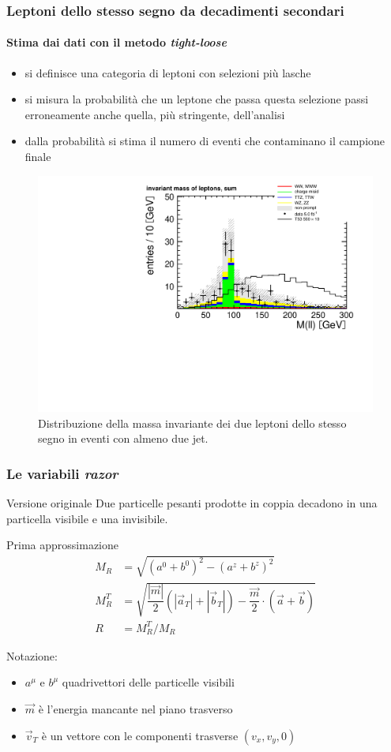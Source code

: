 \documentclass[italian]{beamer}
\begin{document}
\begin{frame}
    \frametitle{Leptoni dello stesso segno da decadimenti secondari}
    \framesubtitle{Stima dai dati con il metodo \emph{tight-loose}}
    \begin{itemize}
        \item si definisce una categoria di leptoni con selezioni pi\`u
            lasche
        \item si misura la probabilit\`a che un leptone che passa questa
            selezione passi erroneamente anche quella, pi\`u stringente, dell'analisi
        \item dalla probabilit\`a si stima il numero di eventi
            che contaminano il campione finale
    \end{itemize}
    \begin{figure}[h]
        \centering
        \includegraphics[width=.5\textwidth]{lep_mass_sum_1}
        \caption{Distribuzione della massa invariante dei due leptoni dello
        stesso segno in eventi con almeno due jet.}
    \end{figure}
\end{frame}

\begin{frame}
    \frametitle{Le variabili \emph{razor}}
    \begin{block}{Versione originale}
        Due particelle pesanti prodotte in coppia decadono in una particella
        visibile e una invisibile.\end{block}
    \begin{block}
        {Prima approssimazione}
        \begin{align*}
            M_R &= \sqrt{(a^0 + b^0)^2 - (a^z + b^z)^2} \\
            M_R^T &= \sqrt{\dfrac{|\vec{m}|}{2} (|\vec{a}_T| + |\vec{b}_T|) 
            -\dfrac{\vec{m}}{2} \cdot (\vec{a} + \vec{b})}\\
            R &= M_R^T / M_R
        \end{align*}
    \end{block}
    Notazione:
    \begin{itemize}
        \item $a^\mu$ e $b^\mu$ quadrivettori delle particelle visibili
        \item $\vec{m}$ \`e l'energia mancante nel piano trasverso \met
        \item $\vec{v}_T$ \`e un vettore con le componenti trasverse $(v_x, v_y, 0)$
    \end{itemize}
\end{frame}
\end{document}
